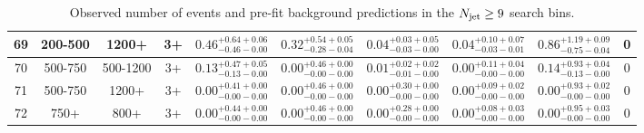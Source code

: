 \documentclass[11pt, oneside]{article}   	%
\newcommand{\njets}{\ensuremath{N_{\rm jet}}\xspace}
\begin{document}
\begin{table}
{\begin{tabular}{ |c|c|c|c||c|c|c|c||c|c| }
69 & 200-500 & 1200+ & 3+ & $0.46^{+0.64+0.06}_{-0.46-0.00}$ & $0.32^{+0.54+0.05}_{-0.28-0.04}$ & $0.04^{+0.03+0.05}_{-0.03-0.00}$ & $0.04^{+0.10+0.07}_{-0.03-0.01}$ & $0.86^{+1.19+0.09}_{-0.75-0.04}$ & 0 \\ \hline
70 & 500-750 & 500-1200 & 3+ & $0.13^{+0.47+0.05}_{-0.13-0.00}$ & $0.00^{+0.46+0.00}_{-0.00-0.00}$ & $0.01^{+0.02+0.02}_{-0.01-0.00}$ & $0.00^{+0.11+0.04}_{-0.00-0.00}$ & $0.14^{+0.93+0.04}_{-0.13-0.00}$ & 0 \\ \hline
71 & 500-750 & 1200+ & 3+ & $0.00^{+0.41+0.00}_{-0.00-0.00}$ & $0.00^{+0.46+0.00}_{-0.00-0.00}$ & $0.00^{+0.30+0.00}_{-0.00-0.00}$ & $0.00^{+0.09+0.02}_{-0.00-0.00}$ & $0.00^{+0.93+0.02}_{-0.00-0.00}$ & 0 \\ \hline
72 & 750+ & 800+ & 3+ & $0.00^{+0.44+0.00}_{-0.00-0.00}$ & $0.00^{+0.46+0.00}_{-0.00-0.00}$ & $0.00^{+0.28+0.00}_{-0.00-0.00}$ & $0.00^{+0.08+0.03}_{-0.00-0.00}$ & $0.00^{+0.95+0.03}_{-0.00-0.00}$ & 0 \\ \hline
\end{tabular}
}
\caption{Observed number of events and pre-fit background predictions in the $\njets\geq9$ search bins.}
\end{table}
\end{document}
